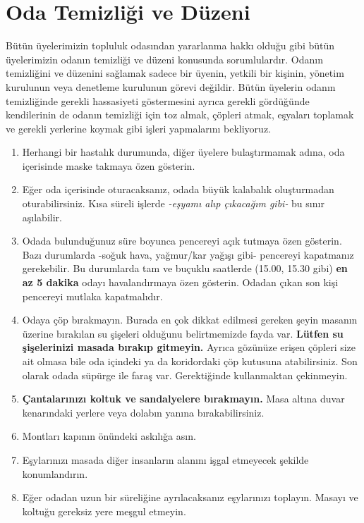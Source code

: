 \documentclass{article}
\begin{document}
\section{Oda Temizliği ve Düzeni}
Bütün üyelerimizin topluluk odasından yararlanma hakkı olduğu gibi bütün üyelerimizin odanın temizliği ve düzeni konusunda sorumlulardır. Odanın temizliğini ve düzenini sağlamak sadece bir üyenin, yetkili bir kişinin, yönetim kurulunun veya denetleme kurulunun görevi değildir. Bütün üyelerin odanın temizliğinde gerekli hassasiyeti göstermesini ayrıca gerekli gördüğünde kendilerinin de odanın temizliği için toz almak, çöpleri atmak, eşyaları toplamak ve gerekli yerlerine koymak gibi işleri yapmalarını bekliyoruz.
\begin{enumerate}
    \item Herhangi bir hastalık durumunda, diğer üyelere bulaştırmamak adına, oda içerisinde maske takmaya özen gösterin.
    \item 	Eğer oda içerisinde oturacaksanız, odada büyük kalabalık oluşturmadan oturabilirsiniz. Kısa süreli işlerde \emph{-eşyamı alıp çıkacağım gibi-} bu sınır aşılabilir.
    \item 	Odada bulunduğunuz süre boyunca pencereyi açık tutmaya özen gösterin. Bazı durumlarda -soğuk hava, yağmur/kar yağışı gibi- pencereyi kapatmanız gerekebilir. Bu durumlarda tam ve buçuklu saatlerde (15.00, 15.30 gibi) \textbf{en az 5 dakika} odayı havalandırmaya özen gösterin. Odadan çıkan son kişi pencereyi mutlaka kapatmalıdır.
    \item 	Odaya çöp bırakmayın. Burada en çok dikkat edilmesi gereken şeyin masanın üzerine bırakılan su şişeleri olduğunu belirtmemizde fayda var. \textbf{Lütfen su şişelerinizi masada bırakıp gitmeyin.} Ayrıca gözünüze erişen çöpleri size ait olmasa bile oda içindeki ya da koridordaki çöp kutusuna atabilirsiniz. Son olarak odada süpürge ile faraş var. Gerektiğinde kullanmaktan çekinmeyin.
    \item \textbf{Çantalarınızı koltuk ve sandalyelere bırakmayın.} Masa altına duvar kenarındaki yerlere veya dolabın yanına bırakabilirsiniz.
    \item Montları kapının önündeki askılığa asın. 
    \item Eşylarınızı masada diğer insanların alanını işgal etmeyecek şekilde konumlandırın.
    \item Eğer odadan uzun bir süreliğine ayrılacaksanız eşylarınızı toplayın. Masayı ve koltuğu gereksiz yere meşgul etmeyin.
\end{enumerate}
\end{document}
